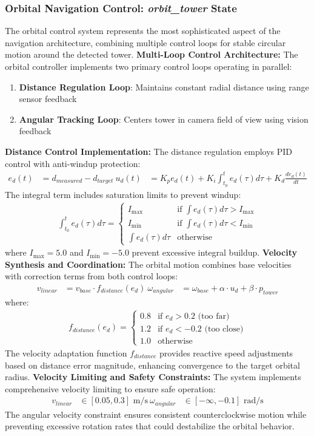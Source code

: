 \subsubsection{Orbital Navigation Control: \textit{orbit\_tower} State}
The orbital control system represents the most sophisticated aspect of the navigation architecture, combining multiple control loops for stable circular motion around the detected tower.
\textbf{Multi-Loop Control Architecture:}
The orbital controller implements two primary control loops operating in parallel:
\begin{enumerate}
\item \textbf{Distance Regulation Loop}: Maintains constant radial distance using range sensor feedback
\item \textbf{Angular Tracking Loop}: Centers tower in camera field of view using vision feedback
\end{enumerate}
\textbf{Distance Control Implementation:}
The distance regulation employs PID control with anti-windup protection:
\begin{align}
e_d(t) &= d_{measured} - d_{target} \
u_d(t) &= K_p e_d(t) + K_i \int_{t_0}^t e_d(\tau) d\tau + K_d \frac{de_d(t)}{dt}
\end{align}
The integral term includes saturation limits to prevent windup:
\begin{align}
\int_{t_0}^t e_d(\tau) d\tau = \begin{cases}
I_{\max} & \text{if } \int e_d(\tau) d\tau > I_{\max} \\
I_{\min} & \text{if } \int e_d(\tau) d\tau < I_{\min} \\
\int e_d(\tau) d\tau & \text{otherwise}
\end{cases}
\end{align}
where $I_{\max} = 5.0$ and $I_{\min} = -5.0$ prevent excessive integral buildup.
\textbf{Velocity Synthesis and Coordination:}
The orbital motion combines base velocities with correction terms from both control loops:
\begin{align}
v_{linear} &= v_{base} \cdot f_{distance}(e_d) \
\omega_{angular} &= \omega_{base} + \alpha \cdot u_d + \beta \cdot p_{tower}
\end{align}
where:
\begin{align}
f_{distance}(e_d) = \begin{cases}
0.8 & \text{if } e_d > 0.2 \text{ (too far)} \\
1.2 & \text{if } e_d < -0.2 \text{ (too close)} \\
1.0 & \text{otherwise}
\end{cases}
\end{align}
The velocity adaptation function $f_{distance}$ provides reactive speed adjustments based on distance error magnitude, enhancing convergence to the target orbital radius.
\textbf{Velocity Limiting and Safety Constraints:}
The system implements comprehensive velocity limiting to ensure safe operation:
\begin{align}
v_{linear} &\in [0.05, 0.3] \text{ m/s} \
\omega_{angular} &\in [-\infty, -0.1] \text{ rad/s}
\end{align}
The angular velocity constraint ensures consistent counterclockwise motion while preventing excessive rotation rates that could destabilize the orbital behavior.
